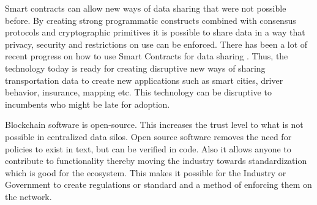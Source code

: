Smart contracts can allow new ways of data sharing that were not possible before. By creating strong programmatic
constructs combined with consensus protocols and cryptographic primitives it is possible to share data in a way that
privacy, security and restrictions on use can be enforced. There has been a lot of recent progress on how to use Smart
Contracts for data sharing \cite{liu_2018}. Thus, the technology today is ready for creating disruptive new ways of
sharing transportation data to create new applications such as smart cities, driver behavior, insurance, mapping etc.
This technology can be disruptive to incumbents who might be late for adoption.

Blockchain software is open-source. This increases the trust level to what is not possible in centralized data silos.
Open source software removes the need for policies to exist in text, but can be verified in code. Also it allows anyone
to contribute to functionality thereby moving the industry towards standardization which is good for the ecosystem. This
makes it possible for the Industry or Government to create regulations or standard and a method of enforcing them on the
network.

%
%
%
%
%
%
%
%
